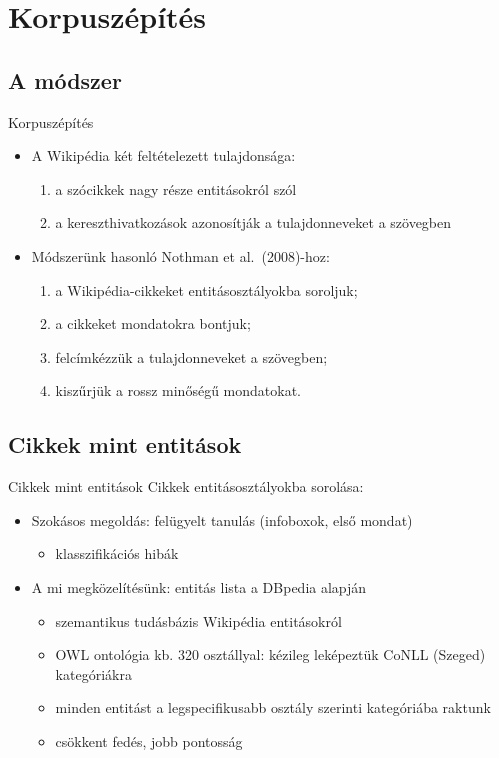 \documentclass[utf8x,t]{beamer}
\newcommand{\vitem}{\item \vspace{4pt}}
\begin{document}
\section{Korpuszépítés}

\subsection*{A módszer}

\begin{frame}{Korpuszépítés}
  \bigskip
  \begin{itemize}
  \vitem A Wikipédia két feltételezett tulajdonsága:
    \begin{enumerate}
    \vitem a szócikkek nagy része entitásokról szól
    \vitem a kereszthivatkozások azonosítják a tulajdonneveket a szövegben
    \end{enumerate}
  \vitem Módszerünk hasonló Nothman et al.~(2008)-hoz:
    \begin{enumerate}
    \vitem a Wikipédia-cikkeket entitásosztályokba soroljuk;
    \vitem a cikkeket mondatokra bontjuk;
    \vitem felcímkézzük a tulajdonneveket a szövegben;
    \vitem kiszűrjük a rossz minőségű mondatokat.
    \end{enumerate}
  \end{itemize}
\end{frame}

\subsection{Cikkek mint entitások}
\begin{frame}{Cikkek mint entitások}
  \bigskip
  Cikkek entitásosztályokba sorolása:
  \smallskip
  \begin{itemize}
  \vitem Szokásos megoldás: felügyelt tanulás (infoboxok, első mondat)
    \begin{itemize}
    \vitem klasszifikációs hibák
    \end{itemize}
  \vitem A mi megközelítésünk: entitás lista a DBpedia alapján
    \begin{itemize}
    \vitem szemantikus tudásbázis Wikipédia entitásokról
    \vitem OWL ontológia kb. 320 osztállyal: kézileg leképeztük CoNLL (Szeged) kategóriákra
    \vitem minden entitást a legspecifikusabb osztály szerinti kategóriába raktunk
    \vitem csökkent fedés, jobb pontosság
    \end{itemize}
  \end{itemize}
\end{frame}
\end{document}

